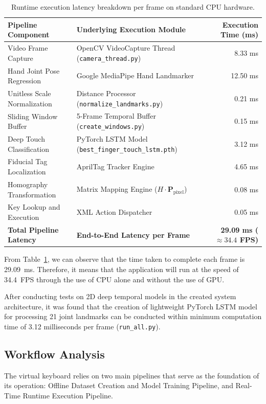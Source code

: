\begin{table}[htbp]
\centering
\caption{Runtime execution latency breakdown per frame on standard CPU hardware.}
\label{tab:latency_breakdown}
\begin{tabular}{l l r}
\toprule
\textbf{Pipeline Component} & \textbf{Underlying Execution Module} & \textbf{Execution Time (ms)} \\
\midrule
Video Frame Capture & OpenCV VideoCapture Thread (\texttt{camera\_thread.py}) & 8.33 ms \\
Hand Joint Pose Regression & Google MediaPipe Hand Landmarker & 12.50 ms \\
Unitless Scale Normalization & Distance Processor (\texttt{normalize\allowbreak\_landmarks.py}) & 0.21 ms \\
Sliding Window Buffer & 5-Frame Temporal Buffer (\texttt{create\allowbreak\_windows.py}) & 0.15 ms \\
Deep Touch Classification & PyTorch LSTM Model (\texttt{best\allowbreak\_finger\allowbreak\_touch\allowbreak\_lstm.pth}) & 3.12 ms \\
Fiducial Tag Localization & AprilTag Tracker Engine & 4.65 ms \\
Homography Transformation & Matrix Mapping Engine ($H \cdot \mathbf{P}_{\text{pixel}}$) & 0.08 ms \\
Key Lookup and Execution & XML Action Dispatcher & 0.05 ms \\
\midrule
\textbf{Total Pipeline Latency} & \textbf{End-to-End Latency per Frame} & \textbf{29.09 ms ($\approx 34.4$ FPS)} \\
\bottomrule
\end{tabular}%
\end{table}

From Table~\ref{tab:latency_breakdown}, we can observe that the time taken to complete each frame is 29.09~ms. Therefore, it means that the application will run at the speed of 34.4~FPS through the use of CPU alone and without the use of GPU.

After conducting tests on 2D deep temporal models in the created system architecture, it was found that the creation of lightweight PyTorch LSTM model for processing 21 joint landmarks can be conducted within minimum computation time of 3.12 milliseconds per frame (\texttt{run\_all.py}).

\subsection{Workflow Analysis}
\label{subsec:lit_workflow_analysis}
The virtual keyboard relies on two main pipelines that serve as the foundation of its operation: Offline Dataset Creation and Model Training Pipeline, and Real-Time Runtime Execution Pipeline.


